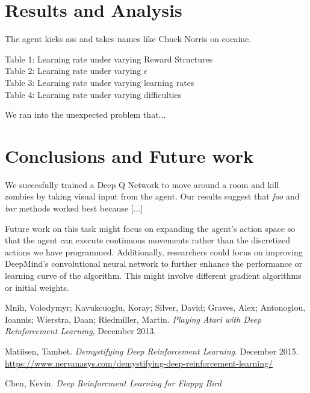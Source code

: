 \documentclass{article}
\begin{document}
\begin{multicols}{2}
\section{Results and Analysis}

The agent kicks ass and takes names like Chuck Norris on cocaine.

\begin{description}
    \item[Table 1: Learning rate under varying Reward Structures]
    \item[Table 2: Learning rate under varying $\epsilon$]
    \item[Table 3: Learning rate under varying learning rates]
    \item[Table 4: Learning rate under varying difficulties]
\end{description}

We ran into the unexpected problem that...





\section{Conclusions and Future work}
We succesfully trained a Deep Q Network to move around a room and kill zombies by taking visual input from the agent.
Our results suggest that \emph{foo} and \emph{bar} methods worked best because [...]

Future work on this task might focus on expanding the agent's action space so that the agent can execute continuous movements rather than the discretized actions we have programmed.
Additionally, researchers could focus on improving DeepMind's convolutional neural network to further enhance the performance or learning curve of the algorithm.
This might involve different gradient algorithms or initial weights.

\end{multicols}





\pagebreak
\begin{thebibliography}{9}


Mnih, Volodymyr; Kavukcuoglu, Koray; Silver, David; Graves, Alex; Antonoglou, Ioannis; Wierstra, Daan; Riedmiller, Martin.
\emph{Playing Atari with Deep Reinforcement Learning},
December 2013.

Matiisen, Tambet.
\emph{Demystifying Deep Reinforcement Learning}. December 2015.
\url{https://www.nervanasys.com/demystifying-deep-reinforcement-learning/}

Chen, Kevin.
\emph{Deep Reinforcment Learning for Flappy Bird}


\end{thebibliography}
\end{document}
